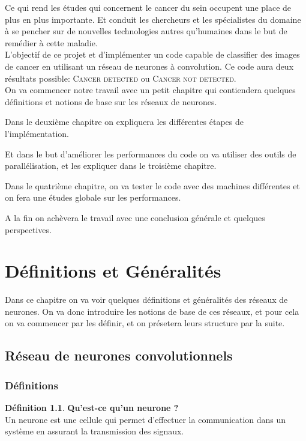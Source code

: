 \documentclass[a4paper,11pt]{report}
\theoremstyle{definition}
\newtheorem{defin}{Définition}[chapter]
\begin{document}
Ce qui rend les études qui concernent le cancer du sein occupent une place de plus en plus importante. Et conduit les chercheurs et les spécialistes du domaine à se pencher sur de nouvelles technologies autres qu’humaines dans le but de remédier à cette maladie. \\

L'objectif de ce projet et d'implémenter un code capable de classifier des images de cancer en utilisant un réseau de neurones à convolution. Ce code aura deux résultats possible: \textsc{Cancer detected} ou \textsc{Cancer not detected}. \\

On va commencer notre travail avec un petit chapitre qui contiendera quelques définitions et notions de base sur les réseaux de neurones. 

Dans le deuxième chapitre on expliquera les différentes étapes de l'implémentation. 

Et dans le but d'améliorer les performances du code on va utiliser des outils de parallélisation, et les expliquer dans le troisième chapitre.

Dans le quatrième chapitre, on va tester le code avec des machines différentes et on fera une études globale sur les performances.

A la fin on achèvera le travail avec une conclusion générale et quelques perspectives.

















\chapter{Définitions et Généralités}

Dans ce chapitre on va voir quelques définitions et généralités des réseaux de neurones. On va donc introduire les notions de base de ces réseaux, et pour cela on va  commencer par les définir, et on présetera leurs structure par la suite.

\section{Réseau de neurones convolutionnels}

\subsection{Définitions}
\begin{defin}{\textbf{Qu'est-ce qu'un neurone ?}} \\

Un neurone est une cellule qui permet d'effectuer la communication dans un système en assurant la transmission des signaux. \cite{ref9}
\end{defin}
\end{document}
